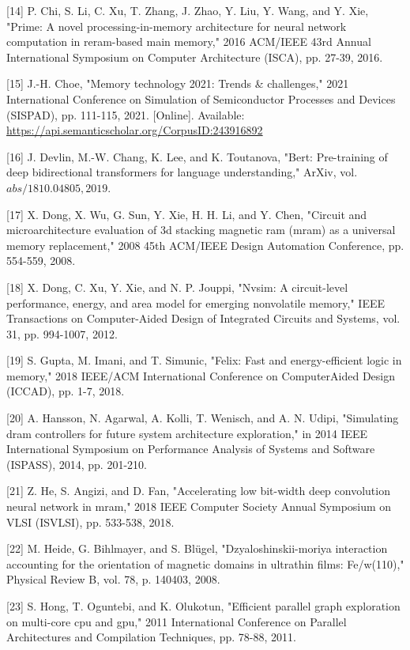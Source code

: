 \documentclass[10pt]{article}
\begin{document}
[14] P. Chi, S. Li, C. Xu, T. Zhang, J. Zhao, Y. Liu, Y. Wang, and Y. Xie, "Prime: A novel processing-in-memory architecture for neural network computation in reram-based main memory," 2016 ACM/IEEE 43rd Annual International Symposium on Computer Architecture (ISCA), pp. 27-39, 2016.

[15] J.-H. Choe, "Memory technology 2021: Trends \& challenges," 2021 International Conference on Simulation of Semiconductor Processes and Devices (SISPAD), pp. 111-115, 2021. [Online]. Available: \href{https://api.semanticscholar.org/CorpusID:243916892}{https://api.semanticscholar.org/CorpusID:243916892}

[16] J. Devlin, M.-W. Chang, K. Lee, and K. Toutanova, "Bert: Pre-training of deep bidirectional transformers for language understanding," ArXiv, vol. $a b s / 1810.04805,2019$.

[17] X. Dong, X. Wu, G. Sun, Y. Xie, H. H. Li, and Y. Chen, "Circuit and microarchitecture evaluation of 3d stacking magnetic ram (mram) as a universal memory replacement," 2008 45th ACM/IEEE Design Automation Conference, pp. 554-559, 2008.

[18] X. Dong, C. Xu, Y. Xie, and N. P. Jouppi, "Nvsim: A circuit-level performance, energy, and area model for emerging nonvolatile memory," IEEE Transactions on Computer-Aided Design of Integrated Circuits and Systems, vol. 31, pp. 994-1007, 2012.

[19] S. Gupta, M. Imani, and T. Simunic, "Felix: Fast and energy-efficient logic in memory," 2018 IEEE/ACM International Conference on ComputerAided Design (ICCAD), pp. 1-7, 2018.

[20] A. Hansson, N. Agarwal, A. Kolli, T. Wenisch, and A. N. Udipi, "Simulating dram controllers for future system architecture exploration," in 2014 IEEE International Symposium on Performance Analysis of Systems and Software (ISPASS), 2014, pp. 201-210.

[21] Z. He, S. Angizi, and D. Fan, "Accelerating low bit-width deep convolution neural network in mram," 2018 IEEE Computer Society Annual Symposium on VLSI (ISVLSI), pp. 533-538, 2018.

[22] M. Heide, G. Bihlmayer, and S. Blügel, "Dzyaloshinskii-moriya interaction accounting for the orientation of magnetic domains in ultrathin films: Fe/w(110)," Physical Review B, vol. 78, p. 140403, 2008.

[23] S. Hong, T. Oguntebi, and K. Olukotun, "Efficient parallel graph exploration on multi-core cpu and gpu," 2011 International Conference on Parallel Architectures and Compilation Techniques, pp. 78-88, 2011.
\end{document}
